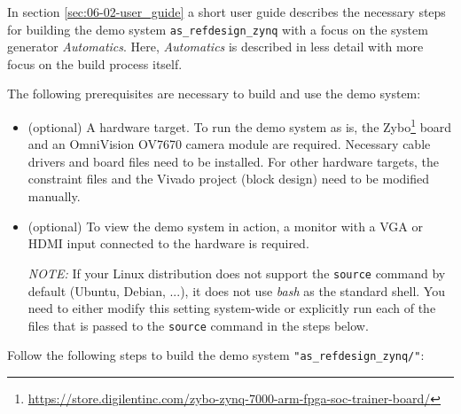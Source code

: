 In section \ref{sec:06-02-user_guide} a short user guide describes the necessary steps for building the demo system \texttt{as\_refdesign\_zynq} with a focus on the \asterics system generator \textit{Automatics}.
Here, \textit{Automatics} is described in less detail with more focus on the build process itself.

The following prerequisites are necessary to build and use the demo system:

\begin{itemize}
\item (optional) A hardware target. To run the demo system as is, the Zybo\footnote{\url{https://store.digilentinc.com/zybo-zynq-7000-arm-fpga-soc-trainer-board/}} board and an OmniVision OV7670 camera module are required. Necessary cable drivers and board files need to be installed.
For other hardware targets, the constraint files and the Vivado project (block design) need to be modified manually.
\item (optional) To view the demo system in action, a monitor with a VGA or HDMI input connected to the hardware is required.

\bigskip
\emph{NOTE:} If your Linux distribution does not support the \texttt{source} command by default (Ubuntu, Debian, ...), it does not use \textit{bash} as the standard shell. You need to either modify this setting system-wide or explicitly run each of the files that is passed to the \texttt{source} command in the steps below.


\end{itemize}

Follow the following steps to build the demo system \texttt{"as\_refdesign\_zynq/"}:

